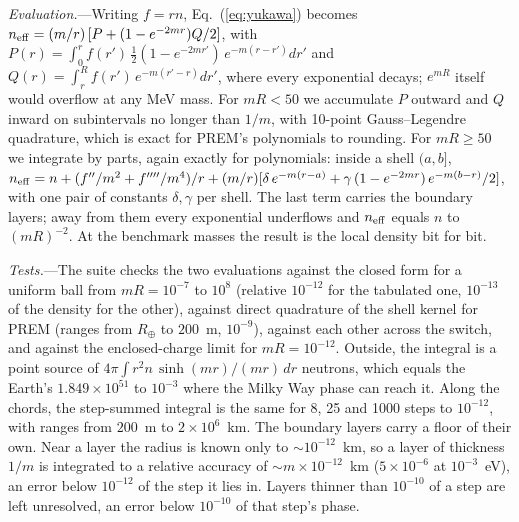 \documentclass[11pt,a4paper]{article}
\begin{document}
\textit{Evaluation.}---Writing $f = rn$, Eq.~(\ref{eq:yukawa}) becomes
$n_{\rm eff} = (m/r)\,[P + (1 - e^{-2mr})Q/2]$, with
$P(r) = \int_0^r f(r')\,\tfrac12(1-e^{-2mr'})\,e^{-m(r-r')}dr'$ and
$Q(r) = \int_r^R f(r')\,e^{-m(r'-r)}dr'$, where every exponential decays; $e^{mR}$ itself would
overflow at any MeV mass. For $mR < 50$ we accumulate $P$ outward and $Q$ inward on
subintervals no longer than $1/m$, with 10-point Gauss--Legendre quadrature, which is exact
for PREM's polynomials to rounding. For $mR \ge 50$ we integrate by parts, again exactly for
polynomials: inside a shell $(a, b]$,
$n_{\rm eff} = n + (f''/m^2 + f''''/m^4)/r + (m/r)[\delta\,e^{-m(r-a)} + \gamma\,(1-e^{-2mr})\,e^{-m(b-r)}/2]$,
with one pair of constants $\delta, \gamma$ per shell. The last term carries the boundary layers;
away from them every exponential underflows and $n_{\rm eff}$ equals $n$ to $(mR)^{-2}$. At the
benchmark masses the result is the local density bit for bit.

\textit{Tests.}---The suite checks the two evaluations against the closed form for a uniform
ball from $mR = 10^{-7}$ to $10^8$ (relative $10^{-12}$ for the tabulated one, $10^{-13}$ of the
density for the other), against direct quadrature of the shell kernel for PREM (ranges from
$R_\oplus$ to $200$~m, $10^{-9}$), against each other across the switch, and against the
enclosed-charge limit for $mR = 10^{-12}$. Outside, the integral is a point source of
$4\pi\int r^2 n\,\sinh(mr)/(mr)\,dr$ neutrons, which equals the Earth's $1.849\times10^{51}$ to
$10^{-3}$ where the Milky Way phase can reach it. Along the chords, the step-summed integral is
the same for 8, 25 and 1000 steps to $10^{-12}$, with ranges from $200$~m to $2\times10^6$~km.
The boundary layers carry a floor of their own. Near a layer the radius is known only to
$\sim10^{-12}$~km, so a layer of thickness $1/m$ is integrated to a relative accuracy of
$\sim m\times10^{-12}$~km ($5\times10^{-6}$ at $10^{-3}$~eV), an error below $10^{-12}$ of the
step it lies in. Layers thinner than $10^{-10}$ of a step are left unresolved, an error below
$10^{-10}$ of that step's phase.
\end{document}

